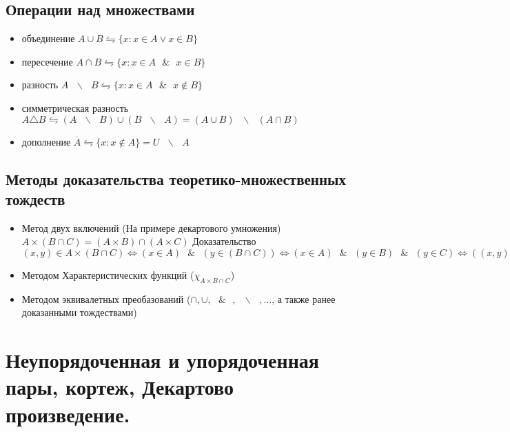 \documentclass{report}
\newcommand{\bslash}{\mbox{ } \backslash \mbox{ }}
\newcommand{\band}{\mbox{ } \& \mbox{ }}
\begin{document}
\subsection{Операции над множествами}
\begin{itemize}
	\item объединение $A \cup B \leftrightharpoons \{x: x \in A \lor x \in B\}$
	\item
	      пересечение $A \cap B \leftrightharpoons \{x: x \in A \band x \in B\}$
	\item
	      разность
	      $ A \bslash B \leftrightharpoons \{x:x \in A \band x \notin B\}$
	\item
	      симметрическая разность
	      $A \triangle B \leftrightharpoons (A \bslash B) \cup (B \bslash A) = (A \cup B) \bslash (A \cap B)$
	\item
	      дополнение
	      $ \overline{A} \leftrightharpoons \{x: x \notin A\} = U \bslash A$
\end{itemize}

\subsection{Методы доказательства теоретико-множественных тождеств}


\begin{itemize}
	\item Метод двух включений (На примере декартового умножения)\newline
	      $A \times (B \cap C) = (A \times B) \cap (A \times C)$\newline
	      \medskip
	      Доказательство\newline
	      $(x,y) \in A \times (B \cap C) \Leftrightarrow (x \in A) \band (y \in (B \cap C)) \Leftrightarrow (x \in A) \band (y \in B) \band (y \in C) \Leftrightarrow ((x,y) \in A \times B) \band ((x,y) \in A \times C) \Leftrightarrow (x,y) \in (A \times B) \cap (A \times C)$
	\item Методом Характеристических функций ($\chi_{A \times {B \cap C}}$)
	\item Методом эквивалетных преобазований ($\cap, \cup, \band, \bslash, ...$, а также
		ранее доказанными тождествами)
\end{itemize}
\newpage

\section{Неупорядоченная и упорядоченная пары, кортеж, Декартово произведение.}
\end{document}
